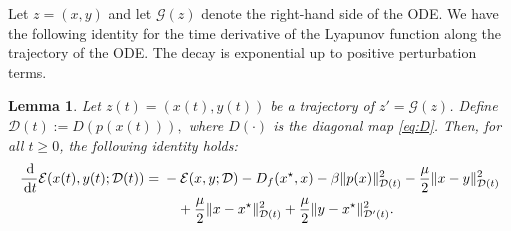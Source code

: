 \documentclass{article}
\newcommand{\dd}{\,{\rm d}}
\theoremstyle{plain}
\newtheorem{lemma}{Lemma}
\newtheorem{proposition}{Proposition}
\theoremstyle{remark}
\begin{document}

Let $z=(x,y)$ and let $\mathcal{G}(z)$ denote the right-hand side of the ODE. We have the following identity for the time derivative of the Lyapunov function along the trajectory of the ODE. The decay is exponential up to positive perturbation terms.

\begin{lemma}
Let $z(t)=(x(t),y(t))$ be a trajectory of $z'=\mathcal{G}(z)$. Define
$\mathcal D(t):=D(p(x(t))),$
where $D(\cdot)$ is the diagonal map \eqref{eq:D}. Then, for all $t\ge 0$, the following identity holds:
$$
\begin{aligned}
\frac{\dd}{\dd t}\mathcal{E}(x(t),y(t);\mathcal D(t))
={}& -\mathcal{E}(x,y;\mathcal D) - D_f(x^\star,x) -\beta\|p(x)\|_{\mathcal D(t)}^2 -\frac{\mu}{2}\|x-y\|_{\mathcal D(t)}^2
\\
&\quad + \frac{\mu}{2}\|x-x^\star\|_{\mathcal D(t)}^2+\frac{\mu}{2}\|y-x^\star\|_{\mathcal D'(t)}^2.
\end{aligned}
$$
\end{lemma}
\end{document}
